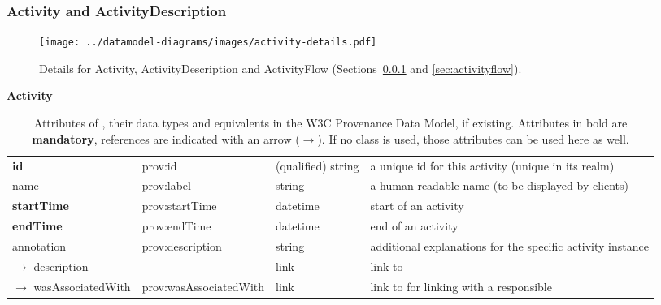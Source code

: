 
\subsubsection{Activity and ActivityDescription}
\label{sec:activity}

\begin{figure}[h]
\centering
\texttt{[image: ../datamodel-diagrams/images/activity-details.pdf]}
\caption[Details for Activity, ActivityDescription and ActivityFlow]{Details for Activity, ActivityDescription and ActivityFlow (Sections~\ref{sec:activity} and \ref{sec:activityflow}).
}
\label{fig:activity-details}
\end{figure}

\begin{table}[h]

\small
{}\textwidth

\textbf{\normalsize Activity}\vspace{0.25em}\\
\begin{tabulary}{1.0\textwidth}{@{}lp{3.5cm}p{2cm}L@{}}
\toprule
{} &  &  & \\
\midrule
\textbf{id} & prov:id  & (qualified) string & a unique id for this activity (unique in its realm)\\
name        & prov:label  & string & a human-readable name (to be displayed by clients)\\
\textbf{startTime} & prov:startTime & datetime & start of an activity\\
\textbf{endTime} & prov:endTime  & datetime & end of an activity\\
annotation        & prov:description & string & additional explanations for the specific activity instance\\
\midrule
$\rightarrow$ description &  & link & link to \\
$\rightarrow$ wasAssociatedWith & prov:wasAssociatedWith  & link & link to  for linking with a responsible \\
\bottomrule
\end{tabulary}
\caption[Attributes of .]{Attributes of , their data types and equivalents in the W3C Provenance 
Data Model, if existing. Attributes in bold are \textbf{mandatory}, references are indicated with an arrow ($\rightarrow$). If no  class is used, those attributes can be used here as well.}
\end{table}


